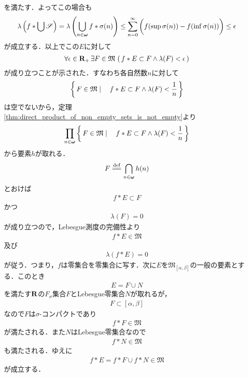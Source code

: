 \begin{sketch}
		を満たす．よってこの場合も
		\begin{align}
			\lambda\left(f \ast \bigcup \mathscr{S}\right)
			= \lambda\left(\bigcup_{n \in {\boldsymbol \omega}} f \ast \sigma(n)\right)
			\leq \sum_{n=0}^{\infty} \left(f(\operatorname*{sup}_{} \sigma(n)) - f(\operatorname*{inf}_{} \sigma(n))\right)
			\leq \epsilon
		\end{align}
		が成立する．以上でこの$E$に対して
		\begin{align}
			\forall \epsilon \in \mathbf{R}_+\, \exists F \in \mathfrak{M}\,
			\left(\, f \ast E \subset F \wedge \lambda(F) < \epsilon\, \right)
		\end{align}
		が成り立つことが示された．すなわち各自然数$n$に対して
		\begin{align}
			\left\{\, F \in \mathfrak{M} \mid \quad f \ast E \subset F \wedge \lambda(F) < \frac{1}{n}\, \right\}
		\end{align}
		は空でないから，定理\ref{thm:direct_product_of_non_empty_sets_is_not_empty}より
		\begin{align}
			\prod_{n \in {\boldsymbol \omega}} \left\{\, F \in \mathfrak{M} \mid \quad f \ast E \subset F \wedge \lambda(F) < \frac{1}{n}\, \right\}
		\end{align}
		から要素$h$が取れる．
		\begin{align}
			F \defeq \bigcap_{n \in \Natural} h(n)
		\end{align}
		とおけば
		\begin{align}
			f \ast E \subset F
		\end{align}
		かつ
		\begin{align}
			\lambda(F) = 0
		\end{align}
		が成り立つので，Lebesgue測度の完備性より
		\begin{align}
			f \ast E \in \mathfrak{M}
		\end{align}
		及び
		\begin{align}
			\lambda(f \ast E) = 0
		\end{align}
		が従う．つまり，$f$は零集合を零集合に写す．次に$E$を$\mathfrak{M}_{[\alpha,\beta]}$の一般の要素とする．このとき
		\begin{align}
			E = F \cup N
		\end{align}
		を満たす$\mathbf{R}$の$F_\sigma$集合$F$とLebesgue零集合$N$が取れるが，
		\begin{align}
			F \subset [\alpha,\beta]
		\end{align}
		なので$F$は$\sigma$-コンパクトであり
		\begin{align}
			f \ast F \in \mathfrak{M}
		\end{align}
		が満たされる．また$N$はLebesgue零集合なので
		\begin{align}
			f \ast N \in \mathfrak{M}
		\end{align}
		も満たされる．ゆえに
		\begin{align}
			f \ast E = f \ast F \cup f \ast N \in \mathfrak{M}
		\end{align}
		が成立する．
		\QED
	\end{sketch}
	
